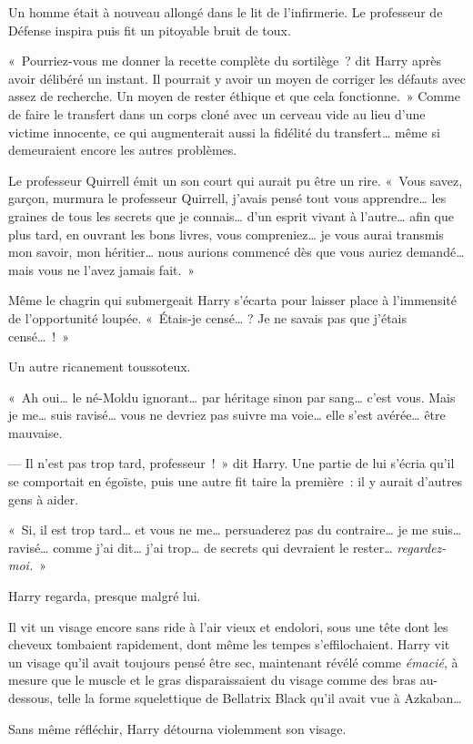{Un homme était à nouveau allongé dans le lit de l'infirmerie.
Le professeur de Défense inspira puis fit un pitoyable bruit de toux.

«~Pourriez-vous me donner la recette complète du sortilège~? dit Harry après avoir délibéré un instant.
Il pourrait y avoir un moyen de corriger les défauts avec assez de recherche.
Un moyen de rester éthique et que cela fonctionne.~»
Comme de faire le transfert dans un corps cloné avec un cerveau vide au lieu d'une victime innocente, ce qui augmenterait aussi la fidélité du transfert… même si demeuraient encore les autres problèmes.

Le professeur Quirrell émit un son court qui aurait pu être un rire.
«~Vous savez, garçon, murmura le professeur Quirrell, j'avais pensé tout vous apprendre… les graines de tous les secrets que je connais… d'un esprit vivant à l'autre… afin que plus tard, en ouvrant les bons livres, vous compreniez… je vous aurai transmis mon savoir, mon héritier… nous aurions commencé dès que vous auriez demandé… mais vous ne l'avez jamais fait.~»

Même le chagrin qui submergeait Harry s'écarta pour laisser place à l'immensité de l'opportunité loupée.
«~Étais-je censé…
? Je ne savais pas que j'étais censé…~!~»

Un autre ricanement toussoteux.

«~Ah oui… le né-Moldu ignorant… par héritage sinon par sang… c'est vous.
Mais je me… suis ravisé… vous ne devriez pas suivre ma voie… elle s'est avérée… être mauvaise.

--- Il n'est pas trop tard, professeur~!~»
dit Harry.
Une partie de lui s'écria qu'il se comportait en égoïste, puis une autre fit taire la première~: il y aurait d'autres gens à aider.

«~Si, il est trop tard… et vous ne me… persuaderez pas du contraire… je me suis… ravisé… comme j'ai dit… j'ai trop… de secrets qui devraient le rester…
\emph{regardez-moi.}~»

Harry regarda, presque malgré lui.

Il vit un visage encore sans ride à l'air vieux et endolori, sous une tête dont les cheveux tombaient rapidement, dont même les tempes s'effilochaient.
Harry vit un visage qu'il avait toujours pensé être sec, maintenant révélé comme \emph{émacié}, à mesure que le muscle et le gras disparaissaient du visage comme des bras au-dessous, telle la forme squelettique de Bellatrix Black qu'il avait vue à Azkaban…

Sans même réfléchir, Harry détourna violemment son visage.

}
